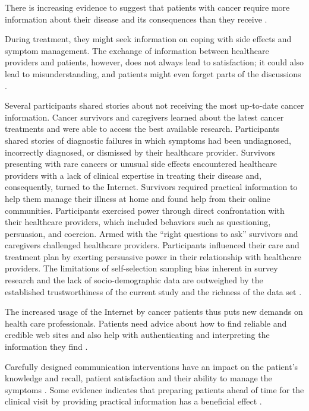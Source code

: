 There is increasing evidence to suggest that patients with cancer require more information about their disease and its consequences than they receive \cite{mcpherson_effective_2001}.

During treatment, they might seek information on coping with side effects and symptom management. The exchange of information between healthcare providers and patients, however, does not always lead to satisfaction; it could also lead to misunderstanding, and patients might even forget parts of the discussions \cite{ley_communicating_1988,hogbin_getting_1989}.

Several participants shared stories about not receiving the most up-to-date cancer information. Cancer survivors and caregivers learned about the latest cancer treatments and were able to access the best available research. Participants shared stories of diagnostic failures in which symptoms had been undiagnosed, incorrectly diagnosed, or dismissed by their healthcare provider. Survivors presenting with rare cancers or unusual side effects encountered healthcare providers with a lack of clinical expertise in treating their disease and, consequently, turned to the Internet. Survivors required practical information to help them manage their illness at home and found help from their online communities. Participants exercised power through direct confrontation with their healthcare providers, which included behaviors such as questioning, persuasion, and coercion. Armed with the ``right questions to ask'' survivors and caregivers challenged healthcare providers. Participants influenced their care and treatment plan by exerting persuasive power in their relationship with healthcare providers. The limitations of self-selection sampling bias inherent in survey research and the lack of socio-demographic data are outweighed by the established trustworthiness of the current study and the richness of the data set \cite{dolce_internet_2011}.

The increased usage of the Internet by cancer patients thus puts new demands on health care professionals. Patients need advice about how to find reliable and credible web sites and also help with authenticating and interpreting the information they find \cite{carlsson_cancer_2009}.

Carefully designed communication interventions have an impact on the patient's knowledge and recall, patient satisfaction and their ability to manage the symptoms \cite{johnson_effects_1982,hack_feasibility_1999,mohide_randomised_1996,mcpherson_effective_2001}. Some evidence indicates that preparing patients ahead of time for the clinical visit by providing practical information has a beneficial effect \cite{huchcroft_testing_1984,cegala_patient_2003}.


